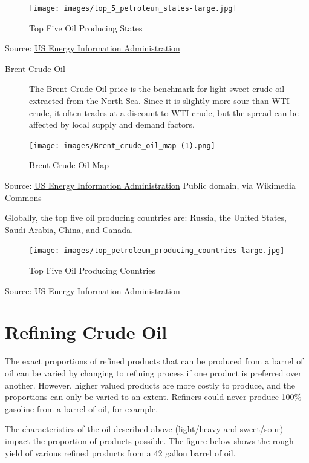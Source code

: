 \documentclass[
]{book}
\begin{document}
\begin{figure}
\centering
\texttt{[image: images/top\_5\_petroleum\_states-large.jpg]}
\caption{Top Five Oil Producing States}
\end{figure}

Source: \href{http://www.eia.gov/Energyexplained/index.cfm?page=oil_home}{US Energy Information Administration}

\begin{description}
\item[Brent Crude Oil]
The Brent Crude Oil price is the benchmark for light sweet crude oil extracted from the North Sea. Since it is slightly more sour than WTI crude, it often trades at a discount to WTI crude, but the spread can be affected by local supply and demand factors.
\end{description}

\begin{figure}
\centering
\texttt{[image: images/Brent\_crude\_oil\_map (1).png]}
\caption{Brent Crude Oil Map}
\end{figure}

Source: \href{http://www.eia.gov/countries/cab.cfm?fips=UK}{US Energy Information Administration} Public domain, via Wikimedia Commons

Globally, the top five oil producing countries are: Russia, the United States, Saudi Arabia, China, and Canada.

\begin{figure}
\centering
\texttt{[image: images/top\_petroleum\_producing\_countries-large.jpg]}
\caption{Top Five Oil Producing Countries}
\end{figure}

Source: \href{http://www.eia.gov/Energyexplained/index.cfm?page=oil_home}{US Energy Information Administration}

\hypertarget{refining-crude-oil}{%
\section{Refining Crude Oil}\label{refining-crude-oil}}

The exact proportions of refined products that can be produced from a barrel of oil can be varied by changing to refining process if one product is preferred over another. However, higher valued products are more costly to produce, and the proportions can only be varied to an extent. Refiners could never produce 100\% gasoline from a barrel of oil, for example.

The characteristics of the oil described above (light/heavy and sweet/sour) impact the proportion of products possible. The figure below shows the rough yield of various refined products from a 42 gallon barrel of oil.
\end{document}
